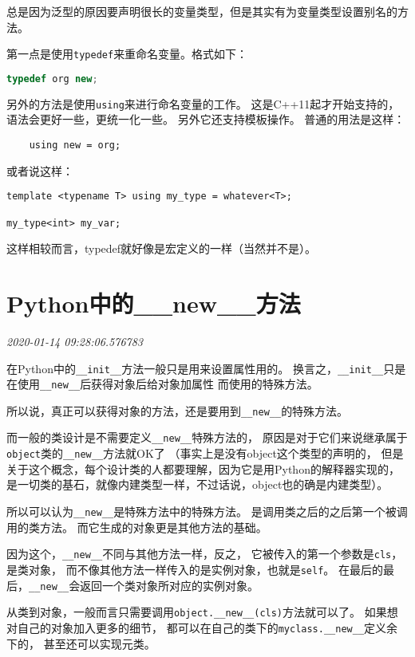 \documentclass{peterlitsdoc}
\newcommand{\timetx}[1]
    {\par\noindent\emph{\pltgray\small #1}\vspace{2em}}
\newcommand{\vb}{\verb}
\begin{document}
总是因为泛型的原因要声明很长的变量类型，但是其实有为变量类型设置别名的方法。

第一点是使用\vb|typedef|来重命名变量。格式如下：

\begin{lstlisting}[language=C++]
    typedef org new;
\end{lstlisting}

另外的方法是使用\vb|using|来进行命名变量的工作。
这是C++11起才开始支持的，语法会更好一些，更统一化一些。
另外它还支持模板操作。
普通的用法是这样：

\begin{lstlisting}
    using new = org;
\end{lstlisting}

或者说这样：

\begin{lstlisting}
template <typename T> using my_type = whatever<T>;

my_type<int> my_var;
\end{lstlisting}

这样相较而言，typedef就好像是宏定义的一样（当然并不是）。


\section{Python中的\_\_new\_\_方法}\timetx{2020-01-14 09:28:06.576783}

在Python中的\vb|__init__|方法一般只是用来设置属性用的。
换言之，\vb|__init__|只是在使用\vb|__new__|后获得对象后给对象加属性
而使用的特殊方法。

所以说，真正可以获得对象的方法，还是要用到\vb|__new__|的特殊方法。

而一般的类设计是不需要定义\vb|__new__|特殊方法的，
原因是对于它们来说继承属于\vb|object|类的\vb|__new__|方法就OK了
（事实上是没有object这个类型的声明的，
但是关于这个概念，每个设计类的人都要理解，因为它是用Python的解释器实现的，
是一切类的基石，就像内建类型一样，不过话说，object也的确是内建类型）。

所以可以认为\vb|__new__|是特殊方法中的特殊方法。
是调用类之后的之后第一个被调用的类方法。
而它生成的对象更是其他方法的基础。

因为这个，\vb|__new__|不同与其他方法一样，反之，
它被传入的第一个参数是\vb|cls|，是类对象，
而不像其他方法一样传入的是实例对象，也就是\vb|self|。
在最后的最后，\vb|__new__|会返回一个类对象所对应的实例对象。

从类到对象，一般而言只需要调用\vb|object.__new__(cls)|方法就可以了。
如果想对自己的对象加入更多的细节，
都可以在自己的类下的\vb|myclass.__new__|定义余下的，
甚至还可以实现元类。
\end{document}
